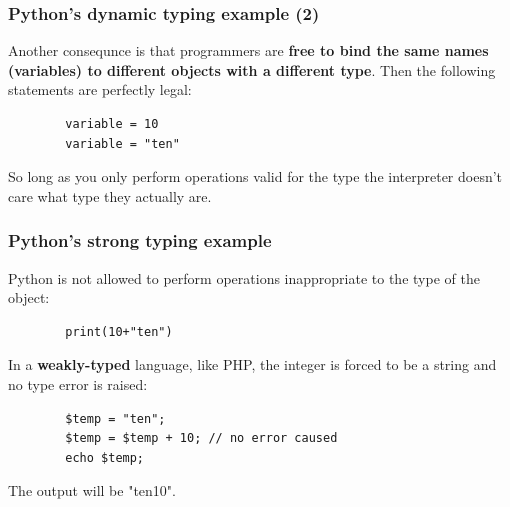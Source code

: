 \documentclass[xcolor ={table,usenames,dvipsnames}]{beamer}
\theoremstyle{definition}
\begin{document}
	\begin{frame}[fragile]
		\frametitle{Python's dynamic typing example (2)}
		Another consequnce is that programmers are \textbf{free to bind the same names (variables) to different objects with a different type}. Then the following statements are perfectly legal:
		
		\begin{lstlisting}
		variable = 10
		variable = "ten"
		\end{lstlisting}
		
		So long as you only perform operations valid for the type the interpreter doesn't care what type they actually are. 
	\end{frame}

	\begin{frame}[fragile]
		\frametitle{Python's strong typing example}
		Python is not allowed to perform operations inappropriate to the type of the object: 
		\begin{lstlisting}
		print(10+"ten")
		\end{lstlisting}
		
		In a \textbf{weakly-typed} language, like PHP, the integer is forced to be a string and no type error is raised:
		\begin{lstlisting}
		$temp = "ten"; 
		$temp = $temp + 10; // no error caused
		echo $temp;
		\end{lstlisting}
	The output will be "ten10".
	\end{frame}

%		

%		
%		
		
\end{document}
